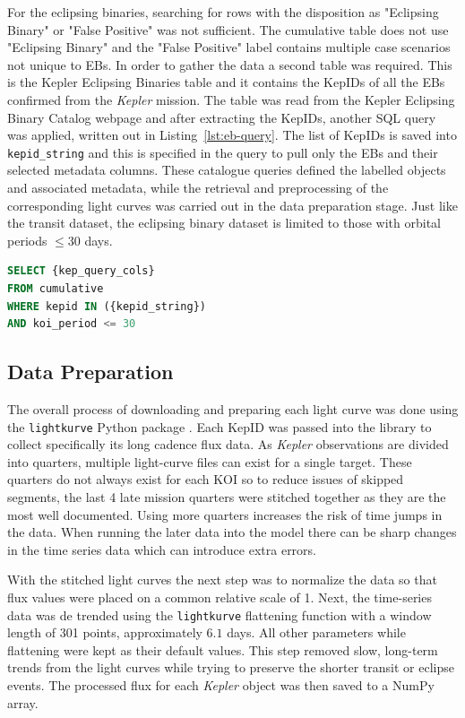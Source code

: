 For the eclipsing binaries, searching for rows with the disposition as "Eclipsing Binary" or "False Positive" was not sufficient. The cumulative table does not use "Eclipsing Binary" and the "False Positive" label contains multiple case scenarios not unique to EBs. In order to gather the data a second table was required. This is the Kepler Eclipsing Binaries table and it contains the KepIDs of all the EBs confirmed from the \textit{Kepler} mission. The table was read from the Kepler Eclipsing Binary Catalog webpage and after extracting the KepIDs, another SQL query was applied, written out in Listing~\ref{lst:eb-query}. The list of KepIDs is saved into \texttt{kepid\_string} and this is specified in the query to pull only the EBs and their selected metadata columns. These catalogue queries defined the labelled objects and associated metadata, while the retrieval and preprocessing of the corresponding light curves was carried out in the data preparation stage. Just like the transit dataset, the eclipsing binary dataset is limited to those with orbital periods $\leq 30$ days.

\begin{lstlisting}[language=SQL, caption={SQL query used to extract eclipsing binary information from Kepler Exoplanet Archive.}, label={lst:eb-query}]
SELECT {kep_query_cols}
FROM cumulative
WHERE kepid IN ({kepid_string})
AND koi_period <= 30
\end{lstlisting}

\subsection{Data Preparation}

The overall process of downloading and preparing each light curve was done using the \texttt{lightkurve} Python package \citep{Lightkurve}. Each KepID was passed into the library to collect specifically its long cadence flux data. As \textit{Kepler} observations are divided into quarters, multiple light-curve files can exist for a single target. These quarters do not always exist for each KOI so to reduce issues of skipped segments, the last 4 late mission quarters were stitched together as they are the most well documented. Using more quarters increases the risk of time jumps in the data. When running the later data into the model there can be sharp changes in the time series data which can introduce extra errors.

With the stitched light curves the next step was to normalize the data so that flux values were placed on a common relative scale of 1. Next, the time-series data was de trended using the \texttt{lightkurve} flattening function with a window length of 301 points, approximately $6.1$ days. All other parameters while flattening were kept as their default values. This step removed slow, long-term trends from the light curves while trying to preserve the shorter transit or eclipse events. The processed flux for each \textit{Kepler} object was then saved to a NumPy array.

